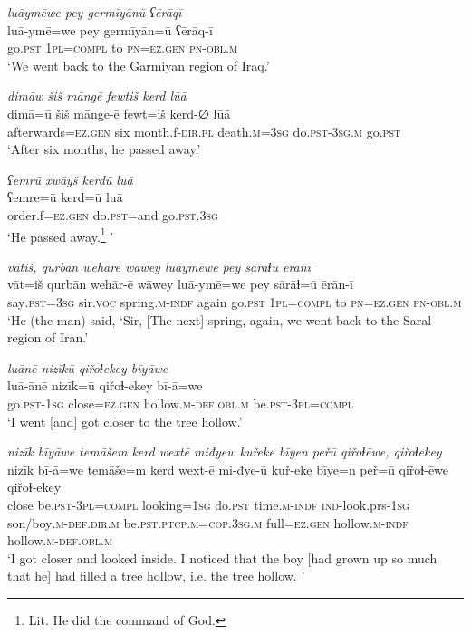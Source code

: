 \ea \label{ZQ.27}
\textit{luāymēwe pey germīyānū ʕērāqī} \\ 
\gll luā-ymē=we pey germīyān=ū ʕērāq-ī \\ 
 go\textsc{.pst} \textsc{1pl}\textsc{=compl} to \textsc{pn}\textsc{=ez.gen} \textsc{pn}\textsc{-obl}\textsc{.m} \\ 
\glt `We went back to the Garmiyan region of Iraq.'
\z 
 
\ea \label{ZQ.30}
\textit{dimāw šiš māngē fewtiš kerd lūā} \\ 
\gll dimā=ū šiš mānge-ē fewt=iš kerd-∅ lūā \\ 
 afterwards\textsc{=ez.gen} six month.f\textsc{-dir}\textsc{.pl} death\textsc{.m}\textsc{=3sg} do\textsc{.pst}\textsc{-3sg}\textsc{.m} go\textsc{.pst} \\ 
\glt `After six months, he passed away.'
\z 
 
\ea \label{ZQ.31}
\textit{ʕemrū xwāyš kerdū luā} \\ 
\gll ʕemre=ū kerd=ū luā \\ 
 order.f\textsc{=ez.gen} do\textsc{.pst}=and go\textsc{.pst}\textsc{.3sg} \\ 
\glt `He passed away.\footnote{Lit. He did the command of God.} '
\z 
 
\ea \label{ZQ.33}
\textit{vātiš, qurbān wehārē wāwey luāymēwe pey sārāɫū ērānī} \\ 
\gll vāt=iš qurbān wehār-ē wāwey luā-ymē=we pey sārāɫ=ū ērān-ī \\ 
 say\textsc{.pst}\textsc{=3sg} sir.\textsc{voc} spring\textsc{.m}\textsc{-indf} again go\textsc{.pst} \textsc{1pl}\textsc{=compl} to \textsc{pn}\textsc{=ez.gen} \textsc{pn}\textsc{-obl}\textsc{.m} \\ 
\glt `He (the man) said, ‘Sir, [The next] spring, again, we went back to the Saral region of Iran.'
\z 
 
\ea \label{ZQ.36}
\textit{luānē nizīkū qiřoɫekey bīyāwe} \\ 
\gll luā-ānē nizīk=ū qiřoɫ-ekey bī-ā=we \\ 
 go\textsc{.pst}\textsc{-\textsc{1sg}} close=\textsc{ez.gen} hollow\textsc{.m}\textsc{-def}\textsc{.obl}\textsc{.m} be\textsc{.pst}\textsc{-3pl}\textsc{=compl} \\ 
\glt `I went [and] got closer to the tree hollow.'
\z 
 
\ea \label{ZQ.38}
\textit{nizīk bīyāwe temāšem kerd wextē miđyew kuřeke bīyen peřū qiřoɫēwe, qiřoɫekey} \\ 
\gll nizīk bī-ā=we temāše=m kerd wext-ē mi-đye-ū kuř-eke bīye=n peř=ū qiřoɫ-ēwe qiřoɫ-ekey \\ 
 close be\textsc{.pst}\textsc{-3pl}\textsc{=compl} looking\textsc{=\textsc{1sg}} do\textsc{.pst} time\textsc{.m}\textsc{-indf} \textsc{ind-}look.prs\textsc{-\textsc{1sg}} son/boy\textsc{.m}\textsc{-def}\textsc{.dir}\textsc{.m} be\textsc{.pst}\textsc{.ptcp}\textsc{.m}\textsc{=cop}\textsc{.3sg}\textsc{.m} full\textsc{=ez.gen} hollow\textsc{.m}\textsc{-indf} hollow\textsc{.m}\textsc{-def}\textsc{.obl}\textsc{.m} \\ 
\glt `I got closer and looked inside. I noticed that the boy [had grown up so much that he] had filled a tree hollow, i.e. the tree hollow. '
\z 
 
